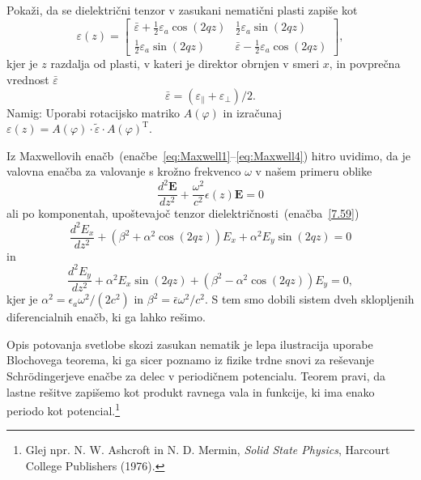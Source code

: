 \begin{naloga}
Pokaži, da se dielektrični tenzor v zasukani nematični plasti zapiše kot
\begin{equation}
\varepsilon (z)=\left[\begin{array}{cc}
\bar{\varepsilon}+\frac{1}{2}\varepsilon_{a}\cos(2qz) & \frac{1}{2}\varepsilon_{a}\sin(2qz)\\
\frac{1}{2}\varepsilon_{a}\sin(2qz) & \bar{\varepsilon}-\frac{1}{2}\varepsilon_{a}\cos(2qz)
\end{array}\right],
\label{7.59}
\end{equation}
kjer  je $z$ razdalja od plasti, v kateri je direktor
obrnjen v smeri $x$, in povprečna vrednost $\bar{\varepsilon}$ 
\begin{equation}
\bar{\varepsilon}=(\varepsilon_{\parallel}+\varepsilon_{\perp})/2.
\label{7.60}
\end{equation}
Namig: Uporabi rotacijsko matriko $A(\varphi)$ in izračunaj  $\varepsilon (z) = A(\varphi) \cdot 
\tilde{\varepsilon} \cdot A(\varphi)^\mathrm{T}$.
\end{naloga}

Iz Maxwellovih enačb~(enačbe~\ref{eq:Maxwell1}--\ref{eq:Maxwell4}) 
hitro uvidimo, da je valovna enačba
za valovanje s krožno frekvenco $\omega$ v našem primeru oblike
\begin{equation}
\frac{d^{2}\mathbf{E}}{dz^{2}}+\frac{\omega^{2}}{c^{2}} \epsilon
(z)\mathbf{E}=0
\label{7.61}
\end{equation}
ali po komponentah, upoštevajoč tenzor dielektričnosti~(enačba~\ref{7.59})
\begin{equation}
\frac{d^{2}E_{x}}{dz^{2}} + 
(\beta^{2}+\alpha^{2}\cos(2qz))E_{x}+\alpha^{2}E_{y}\sin(2qz) = 0
\label{7.62a}
\end{equation}
in 
\begin{equation}
\frac{d^{2}E_{y}}{dz^{2}} +
\alpha^{2}E_{x}\sin(2qz)+(\beta^{2}-\alpha^{2}\cos(2qz))E_{y} = 0,
\label{7.62b}
\end{equation}
kjer je $\alpha^{2}=\epsilon_{a}\omega^{2}/(2c^{2})$ in 
$\beta^{2}=\bar{\epsilon}\omega^{2}/c^{2}$. S tem smo dobili sistem
dveh sklopljenih diferencialnih enačb, ki ga lahko rešimo.
\begin{remark}
Opis potovanja svetlobe skozi zasukan nematik je lepa ilustracija uporabe 
Blochovega teorema, ki ga sicer poznamo iz fizike trdne snovi za 
reševanje Schr\"odingerjeve enačbe za delec v periodičnem potencialu. Teorem pravi, 
da lastne rešitve zapišemo kot produkt ravnega vala in funkcije, ki ima enako 
periodo kot potencial.\footnote{Glej npr. N. W. Ashcroft in 
N. D. Mermin, {\it Solid State Physics}, Harcourt College
Publishers (1976).}
\end{remark}


